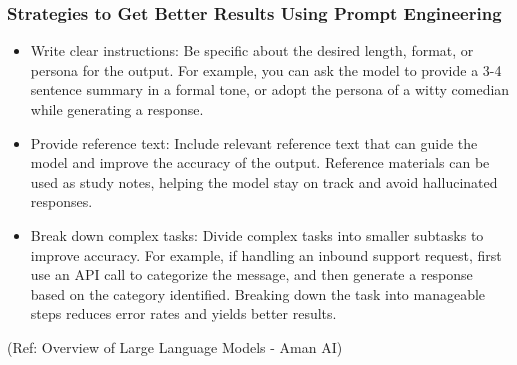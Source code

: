 


\begin{frame}[fragile]\frametitle{Strategies to Get Better Results Using Prompt Engineering}

\begin{itemize}
\item Write clear instructions: Be specific about the desired length, format, or persona for the output. For example, you can ask the model to provide a 3-4 sentence summary in a formal tone, or adopt the persona of a witty comedian while generating a response.
\item Provide reference text: Include relevant reference text that can guide the model and improve the accuracy of the output. Reference materials can be used as study notes, helping the model stay on track and avoid hallucinated responses.
\item Break down complex tasks: Divide complex tasks into smaller subtasks to improve accuracy. For example, if handling an inbound support request, first use an API call to categorize the message, and then generate a response based on the category identified. Breaking down the task into manageable steps reduces error rates and yields better results.
\end{itemize}

{\tiny (Ref: Overview of Large Language Models - Aman AI)}

\end{frame}


